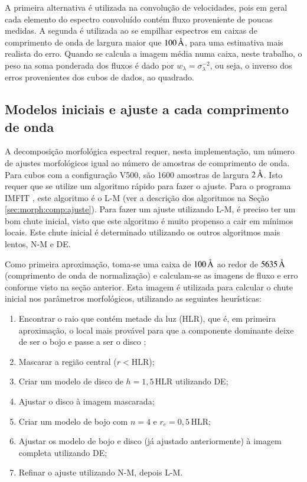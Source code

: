 A primeira alternativa é utilizada na convolução de velocidades, pois em geral
cada elemento do espectro convoluído contém fluxo proveniente de poucas medidas.
A segunda é utilizada ao se empilhar espectros em caixas de comprimento de onda
de largura maior que $100\,\text{\normalfont\AA}$, para uma estimativa mais realista do
erro. Quando se calcula a imagem média numa caixa, neste trabalho, o peso na
soma ponderada dos fluxos é dado por $w_\lambda = \sigma_\lambda^{-2}$, ou seja,
o inverso dos erros provenientes dos cubos de dados, ao quadrado.


\subsection{Modelos iniciais e ajuste a cada comprimento de onda}
\label{sec:Decomp:initmodel}

A decomposição morfológica espectral requer, nesta implementação, um número de
ajustes morfológicos igual ao número de amostras de comprimento de onda. Para
cubos com a configuração V500, são 1600 amostras de largura $2\,\text{\normalfont\AA}$. Isto
requer que se utilize um algoritmo rápido para fazer o ajuste. Para o programa
IMFIT \citep{Erwin2015}, este algoritmo é o L-M (ver a descrição dos algoritmos
na Seção \ref{sec:morph:comp:ajuste}). Para fazer um ajuste utilizando L-M, é
preciso ter um bom chute inicial, visto que este algoritmo é muito propenso a
cair em mínimos locais. Este chute inicial é determinado utilizando os outros
algoritmos mais lentos, N-M e DE.

Como primeira aproximação, toma-se uma caixa de $100\,\text{\normalfont\AA}$ ao redor de
$5635\,\text{\normalfont\AA}$ (comprimento de onda de normalização) e calculam-se as imagens
de fluxo e erro conforme visto na seção anterior. Esta imagem é utilizada para
calcular o chute inicial nos parâmetros morfológicos, utilizando as seguintes
heurísticas:
\begin{enumerate}
  \item Encontrar o raio que contém metade da luz ($\mathrm{HLR}$), que é, em
  primeira aproximação, o local mais provável para que a componente dominante
  deixe de ser o bojo e passe a ser o disco \citep{GonzalezDelgado2015};
  \item Mascarar a região central ($r < \mathrm{HLR}$);
  \item Criar um modelo de disco de $h=1,5\,\mathrm{HLR}$ utilizando DE;
  \item Ajustar o disco à imagem mascarada;
  \item Criar um modelo de bojo com $n = 4$ e $r_e = 0,5\,\mathrm{HLR}$;
  \item Ajustar os modelo de bojo e disco (já ajustado anteriormente) à imagem
  completa utilizando DE;
  \item Refinar o ajuste utilizando N-M, depois L-M.
\end{enumerate}

